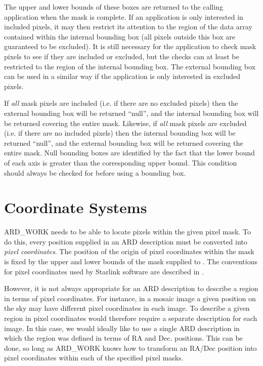 The upper and lower bounds of these boxes are returned to the calling 
application when the mask is complete. If an application is only interested in 
included pixels, it may then restrict its attention to the region of the data 
array contained within the internal bounding box (all pixels outside this box 
are guaranteed to be excluded). It is still necessary for the application to 
check mask pixels to see if they are included or excluded, but the checks can 
at least be restricted to the region of the internal bounding box. The external 
bounding box can be used in a similar way if the application is only interested 
in excluded pixels.

If {\em all} mask pixels are included (i.e. if there are no excluded pixels)
then the external bounding box will be returned ``null'', and the internal
bounding box will be returned covering the entire mask. Likewise, if {\em all}
mask pixels are excluded (i.e. if there are no included pixels) then the
internal bounding box will be returned ``null'', and the external bounding box
will be returned covering the entire mask. Null bounding boxes are identified by
the fact that the lower bound of each axis is greater than the corresponding
upper bound. This condition should always be checked for before using a 
bounding box. 

\section{\label{SEC:COORD}Coordinate Systems}
ARD\_WORK needs to be able to locate pixels within the given pixel mask.
To do this, every position supplied in an ARD description must be
converted into {\em pixel coordinates}. The position of the origin of
pixel coordinates within the mask is fixed by the upper and lower bounds
of the mask supplied to . The conventions
for pixel coordinates used by Starlink software are described in
.

However, it is not always appropriate for an ARD description to describe
a region in terms of pixel coordinates. For instance, in a mosaic image
a given position on the sky may have different pixel coordinates in each
image. To describe a given region in pixel coordinates would therefore
require a separate description for each image. In this case, we would
ideally like to use a single ARD description in which the region was
defined in terms of RA and Dec. positions. This can be done, so long as
ARD\_WORK knows how to transform an RA/Dec position into pixel
coordinates within each of the specified pixel masks.

